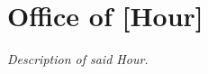 \documentclass{office-sheet}
\begin{document}
\chapter*{Office of [Hour]}

 \textit{Description of said Hour.}
\end{document}
